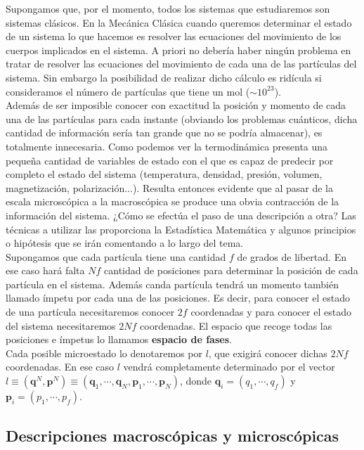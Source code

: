 \documentclass[12pt,a4paper]{article}
\numberwithin{equation}{section}
\numberwithin{figure}{section}
\newcommand{\qn}{\mathbf{q}}
\newcommand{\pn}{\mathbf{p}}
\theoremstyle{definition}
\begin{document}
Supongamos que, por el momento, todos los sistemas que estudiaremos son sistemas clásicos. En la Mecánica Clásica cuando queremos determinar el estado de un sistema lo que hacemos es resolver las ecuaciones del movimiento de los cuerpos implicados en el sistema. A priori no debería haber ningún problema en tratar de resolver las ecuaciones del movimiento de cada una de las partículas del sistema. Sin embargo la posibilidad de realizar dicho cálculo es ridícula si consideramos el número de partículas que tiene un mol ($\sim 10^{23}$). \\

Además de ser imposible conocer con exactitud la posición y momento de cada una de las partículas para cada instante (obviando los problemas cuánticos, dicha cantidad de información sería tan grande que no se podría almacenar), es totalmente innecesaria. Como podemos ver la termodinámica presenta una pequeña cantidad de variables de estado con el que es capaz de predecir por completo el estado del sistema (temperatura, densidad, presión, volumen, magnetización, polarización...). Resulta entonces evidente que al pasar de la escala microscópica a la macroscópica se produce una obvia contracción de la información del sistema. ¿Cómo se efectúa el paso de una descripción a otra? Las técnicas a utilizar las proporciona la Estadística Matemática y algunos principios o hipótesis que se irán comentando a lo largo del tema. \\

Supongamos que cada partícula tiene una cantidad $f$ de grados de libertad. En ese caso hará falta $Nf$ cantidad de posiciones para determinar la posición de cada partícula en el sistema. Además canda partícula tendrá un momento también llamado ímpetu por cada una de las posiciones. Es decir, para conocer el estado de una partícula necesitaremos conocer $2f$ coordenadas y para conocer el estado del sistema necesitaremos $2Nf$ coordenadas. El espacio que recoge todas las posiciones e ímpetus lo llamamos \textbf{espacio de fases}. \\

Cada posible microestado lo denotaremos por $l$, que exigirá conocer dichas $2Nf$ coordenadas. En ese caso $l$ vendrá completamente determinado por el vector $ l \equiv (\qn^N,\pn^N) \equiv (\qn_1,\cdots,\qn_N,\pn_1,\cdots,\pn_N)$, donde $\qn_i = (q_1,\cdots,q_f)$ y $\pn_i = (p_1,\cdots,p_f)$. 

\subsection{Descripciones macroscópicas y microscópicas}
\end{document}
